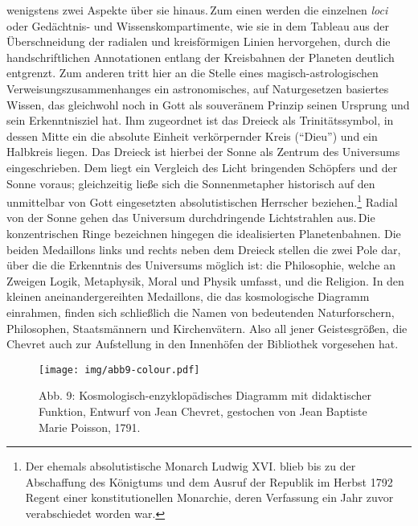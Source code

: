 wenigstens zwei Aspekte über sie hinaus.\,Zum einen werden die einzelnen
\emph{loci} oder Gedächtnis- und Wissenskompartimente, wie sie in dem
Tableau aus der Überschneidung der radialen und kreisförmigen Linien
hervorgehen, durch die handschriftlichen Annotationen entlang der
Kreisbahnen der Planeten deutlich entgrenzt. Zum anderen tritt hier an
die Stelle eines magisch-astrologischen Verweisungszusammenhanges ein
astronomisches, auf Naturgesetzen basiertes Wissen, das gleichwohl noch
in Gott als souveränem Prinzip seinen Ursprung und sein Erkenntnisziel
hat. Ihm zugeordnet ist das Dreieck als Trinitätssymbol, in dessen Mitte
ein die absolute Einheit verkörpernder Kreis (\enquote{Dieu}) und ein
Halbkreis liegen. Das Dreieck ist hierbei der Sonne als Zentrum des
Universums eingeschrieben. Dem liegt ein Vergleich des Licht bringenden
Schöpfers und der Sonne voraus; gleichzeitig ließe sich die
Sonnenmetapher historisch auf den unmittelbar von Gott eingesetzten
absolutistischen Herrscher beziehen.\footnote{Der ehemals
  absolutistische Monarch Ludwig XVI. blieb bis zu der Abschaffung des
  Königtums und dem Ausruf der Republik im Herbst 1792 Regent einer
  konstitutionellen Monarchie, deren Verfassung ein Jahr zuvor
  verabschiedet worden war.} Radial von der Sonne gehen das Universum
durchdringende Lichtstrahlen aus.\,Die konzentrischen Ringe bezeichnen
hingegen die idealisierten Planetenbahnen. Die beiden Medaillons links
und rechts neben dem Dreieck stellen die zwei Pole dar, über die die
Erkenntnis des Universums möglich ist: die Philosophie, welche an
Zweigen Logik, Metaphysik, Moral und Physik umfasst, und die Religion.
In den kleinen aneinandergereihten Medaillons, die das kosmologische
Diagramm einrahmen, finden sich schließlich die Namen von bedeutenden
Naturforschern, Philosophen, Staatsmännern und Kirchenvätern. Also all
jener Geistesgrößen, die Chevret auch zur Aufstellung in den Innenhöfen
der Bibliothek vorgesehen hat.

\begin{figure}[htbp]
\centering
\texttt{[image: img/abb9-colour.pdf]}
\caption*{Abb. 9: Kosmologisch-enzyklopädisches Diagramm mit didaktischer
Funktion, Entwurf von Jean Chevret, gestochen von Jean Baptiste Marie
Poisson, 1791.}
\end{figure}

